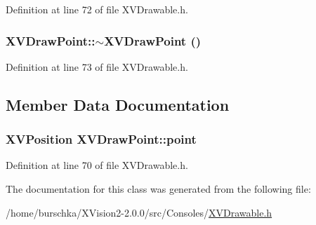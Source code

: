 Definition at line 72 of file XVDrawable.h.\label{XVDrawPoint_a1}
\hypertarget{class_XVDrawPoint_a1}{
\subsubsection[~XVDrawPoint]{\setlength{\rightskip}{0pt plus 5cm}XVDraw\-Point::$\sim$XVDraw\-Point ()}}




Definition at line 73 of file XVDrawable.h.

\subsection{Member Data Documentation}
\label{XVDrawPoint_m0}
\hypertarget{class_XVDrawPoint_m0}{
\subsubsection[point]{\setlength{\rightskip}{0pt plus 5cm}XVPosition XVDraw\-Point::point}}




Definition at line 70 of file XVDrawable.h.

The documentation for this class was generated from the following file:\begin{CompactItemize}
\item 
/home/burschka/XVision2-2.0.0/src/Consoles/\hyperlink{XVDrawable.h-source}{XVDrawable.h}\end{CompactItemize}
